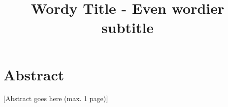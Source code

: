 \documentclass[a4paper, oneside, 12pt]{article}
\title{Wordy Title - Even wordier subtitle}
\begin{document}




\clearpage
\thispagestyle{empty}
\section*{Abstract}

[Abstract goes here (max. 1 page)]



\clearpage
{}
\tableofcontents
\clearpage
\listoffigures
\clearpage
\listoftables
\clearpage













\appendix
\renewcommand*{\thesection}{\Alph{section}}\textbf{}








\clearpage
\renewcommand*{\thesection}{}\textbf{}



\end{document}
